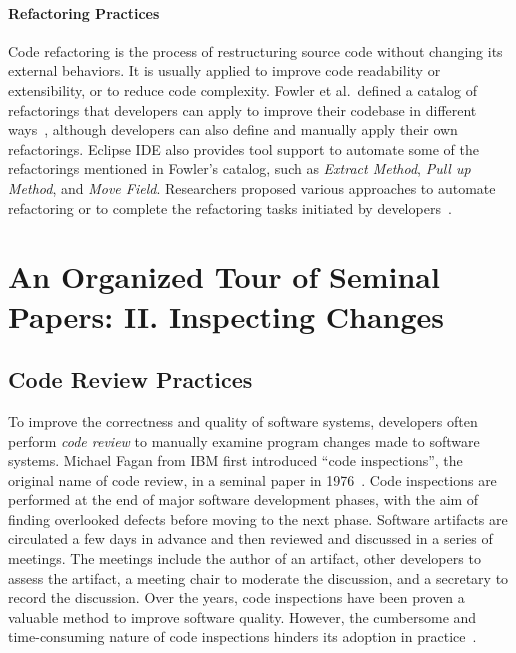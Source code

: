 \documentclass[runningheads,a4paper]{llncs}
\begin{document}
\paragraph{Refactoring Practices} 
Code refactoring is the process of restructuring source code without changing its external behaviors. It is usually applied to improve code readability or extensibility, or to reduce code complexity. 
Fowler et al.~defined a catalog of refactorings that developers can apply to improve their codebase in different ways~\cite{1999:RID}, although developers can also define and manually apply their own refactorings. Eclipse IDE also provides tool support to automate some of the refactorings mentioned in Fowler's catalog, such as \emph{Extract Method}, \emph{Pull up Method}, and \emph{Move Field}. Researchers proposed various approaches to automate refactoring or to complete the refactoring tasks initiated by developers~\cite{Griswold:1992,Balazinska1999,Dig:2009,Ge:2012,Chen:2013,Lee:2013,Tsantalis2013:icsm,Meng:2015,Kim:2016}.

\section{An Organized Tour of Seminal Papers: II. Inspecting Changes}
\label{sec:inspect}

\subsection{Code Review Practices}
To improve the correctness and quality of software systems, developers often perform {\em code review} to manually examine program changes made to software systems. Michael Fagan from IBM first introduced ``code inspections'', the original name of code review, in a seminal paper in 1976~\cite{fagan2001design}. Code inspections are performed at the end of major software development phases, with the aim of finding overlooked defects before moving to the next phase. Software artifacts are circulated a few days in advance and then reviewed and discussed in a series of meetings. The meetings include the author of an artifact, other developers to assess the artifact, a meeting chair to moderate the discussion, and a secretary to record the discussion. Over the years, code inspections have been proven a valuable method to improve  software quality. However, the cumbersome and time-consuming nature of code inspections hinders its adoption in practice~\cite{johnson1998reengineering}. 
\end{document}
